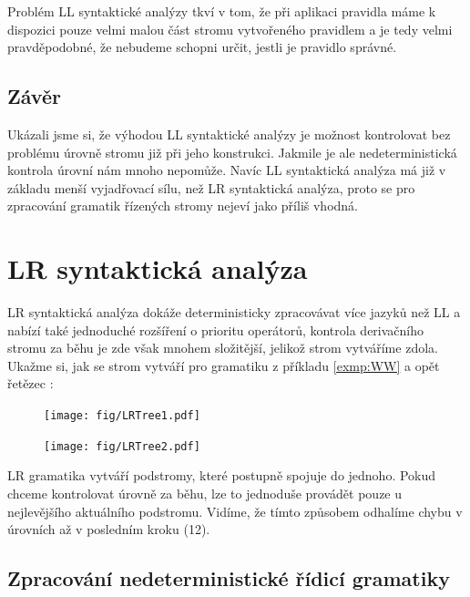 Problém LL syntaktické analýzy tkví v tom, že při aplikaci pravidla máme k
dispozici pouze velmi malou část stromu vytvořeného pravidlem a je tedy velmi
pravděpodobné, že nebudeme schopni určit, jestli je pravidlo správné.\\

\subsection*{Závěr}

Ukázali jsme si, že výhodou LL syntaktické analýzy je možnost kontrolovat
bez problému úrovně stromu již při jeho konstrukci.
Jakmile je ale  nedeterministická kontrola úrovní
nám mnoho nepomůže.
Navíc LL syntaktická analýza má již v základu menší vyjadřovací sílu, než
LR syntaktická analýza, proto se pro zpracování gramatik řízených stromy
nejeví jako příliš vhodná.

\section{LR syntaktická analýza}
\label{subsection:LR}
LR syntaktická analýza dokáže deterministicky zpracovávat více jazyků
než LL a nabízí také jednoduché rozšíření o prioritu operátorů,
kontrola derivačního stromu za běhu je zde však mnohem složitější,
jelikož strom vytváříme zdola. Ukažme si, jak se strom vytváří pro
gramatiku z příkladu \ref{exmp:WW} a opět řetězec :

\begin{figure}[H]
  \centering
  \texttt{[image: fig/LRTree1.pdf]}
\end{figure}

\begin{figure}[H]
  \centering
  \texttt{[image: fig/LRTree2.pdf]}
\end{figure}

LR gramatika vytváří podstromy, které postupně spojuje do jednoho.
Pokud chceme kontrolovat úrovně za běhu, lze to jednoduše provádět pouze
u nejlevějšího aktuálního podstromu.
Vidíme, že tímto způsobem odhalíme chybu v úrovních až v posledním kroku (12).\\

\subsection{Zpracování nedeterministické řídicí gramatiky}

